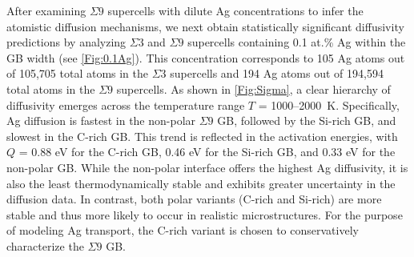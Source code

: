 \documentclass[%
preprint,
amsmath,amssymb,
aps,
]{revtex4-2}
\newcommand{\?}{\stackrel{?}{=}}
\begin{document}

After examining $\Sigma 9$ supercells with dilute Ag concentrations to infer the atomistic diffusion mechanisms, we next obtain statistically significant diffusivity predictions by analyzing $\Sigma 3$ and $\Sigma 9$ supercells containing 0.1 at.\% Ag within the GB width (see \cref{Fig:0.1Ag}). This concentration corresponds to 105 Ag atoms out of 105,705 total atoms in the $\Sigma 3$ supercells and 194 Ag atoms out of 194,594 total atoms in the $\Sigma 9$ supercells. As shown in \cref{Fig:Sigma}, a clear hierarchy of diffusivity emerges across the temperature range $T$ = 1000--2000~K. Specifically, Ag diffusion is fastest in the non-polar $\Sigma 9$ GB, followed by the Si-rich GB, and slowest in the C-rich GB. This trend is reflected in the activation energies, with $Q$ = 0.88 eV for the C-rich GB, 0.46 eV for the Si-rich GB, and 0.33 eV for the non-polar GB. While the non-polar interface offers the highest Ag diffusivity, it is also the least thermodynamically stable \cite{Kohyama1991} and exhibits greater uncertainty in the diffusion data. In contrast, both polar variants (C-rich and Si-rich) are more stable and thus more likely to occur in realistic microstructures. For the purpose of modeling Ag transport, the C-rich variant is chosen to conservatively characterize the $\Sigma 9$ GB.
\end{document}
